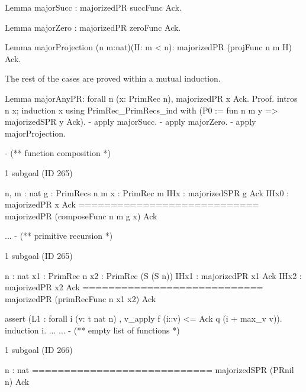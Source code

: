 \begin{Coqsrc}
Lemma majorSucc : majorizedPR  succFunc Ack.

Lemma majorZero : majorizedPR  zeroFunc Ack.

Lemma majorProjection (n m:nat)(H: m < n):
  majorizedPR (projFunc n m H) Ack.
\end{Coqsrc}


The rest of the cases are proved within a mutual  induction.


\begin{Coqsrc}
Lemma majorAnyPR:  forall n (x: PrimRec n),  majorizedPR  x Ack.
Proof.
  intros n x; induction x using PrimRec_PrimRecs_ind with
                  (P0 := fun n m y => majorizedSPR  y Ack).
  - apply majorSucc.
  - apply majorZero.
  - apply majorProjection. 
  \end{Coqsrc}

  \begin{Coqsrc}
  - (** function composition *)
\end{Coqsrc}
\begin{Coqanswer}
1 subgoal (ID 265)

  n, m : nat
  g : PrimRecs n m
  x : PrimRec m
  IHx : majorizedSPR g Ack
  IHx0 : majorizedPR x Ack
  ============================
  majorizedPR (composeFunc n m g x) Ack
\end{Coqanswer}

\begin{Coqsrc}
  ...
 - (** primitive recursion *)
\end{Coqsrc}

\begin{Coqanswer}
1 subgoal (ID 265)
  
  n : nat
  x1 : PrimRec n
  x2 : PrimRec (S (S n))
  IHx1 : majorizedPR x1 Ack
  IHx2 : majorizedPR x2 Ack
  ============================
  majorizedPR (primRecFunc n x1 x2) Ack
\end{Coqanswer}

\begin{Coqsrc}
 assert (L1 : forall i (v: t nat n) ,
               v_apply f (i::v)  <= Ack q (i + max_v v)).
    { induction i.
      ...
    }
    ...
-  (** empty list of functions *)
\end{Coqsrc}

\begin{Coqanswer}
1 subgoal (ID 266)
  
  n : nat
  ============================
  majorizedSPR (PRnil n) Ack
\end{Coqanswer}

